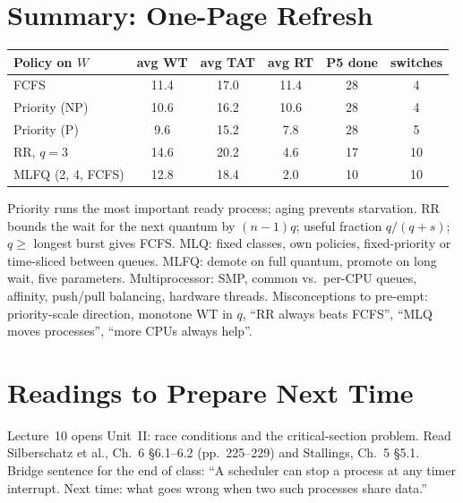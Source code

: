 \documentclass[11pt]{article}
\begin{document}
\section{Summary: One-Page Refresh}

\begin{center}
\renewcommand{\arraystretch}{1.15}
\begin{tabular}{lccccc}
  \textbf{Policy on $W$} & \textbf{avg WT} & \textbf{avg TAT} & \textbf{avg RT} & \textbf{P5 done} & \textbf{switches} \\ \hline
  FCFS & 11.4 & 17.0 & 11.4 & 28 & 4 \\
  Priority (NP) & 10.6 & 16.2 & 10.6 & 28 & 4 \\
  Priority (P) & 9.6 & 15.2 & 7.8 & 28 & 5 \\
  RR, $q=3$ & 14.6 & 20.2 & 4.6 & 17 & 10 \\
  MLFQ (2, 4, FCFS) & 12.8 & 18.4 & 2.0 & 10 & 10 \\
\end{tabular}
\end{center}

Priority runs the most important ready process; aging prevents starvation. RR bounds the wait for the next quantum by $(n-1)q$; useful fraction $q/(q+s)$; $q\ge$ longest burst gives FCFS. MLQ: fixed classes, own policies, fixed-priority or time-sliced between queues. MLFQ: demote on full quantum, promote on long wait, five parameters. Multiprocessor: SMP, common vs.\ per-CPU queues, affinity, push/pull balancing, hardware threads. Misconceptions to pre-empt: priority-scale direction, monotone WT in $q$, ``RR always beats FCFS'', ``MLQ moves processes'', ``more CPUs always help''.

\section{Readings to Prepare Next Time}

Lecture~10 opens Unit~II: race conditions and the critical-section problem. Read Silberschatz et al., Ch.~6 \S6.1--6.2 (pp.~225--229) and Stallings, Ch.~5 \S5.1. Bridge sentence for the end of class: ``A scheduler can stop a process at any timer interrupt. Next time: what goes wrong when two such processes share data.''
\end{document}
